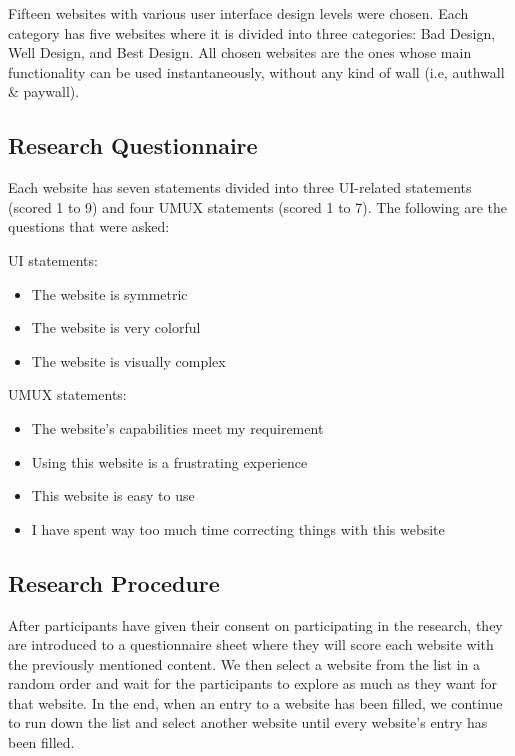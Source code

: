 \documentclass[conference]{IEEEtran}
\begin{document}
Fifteen websites with various user interface design levels were chosen. Each category has five websites where it is divided into three categories: Bad Design, Well Design, and Best Design. All chosen websites are the ones whose main functionality can be used instantaneously, without any kind of wall (i.e, authwall \& paywall).

\subsection{Research Questionnaire}

Each website has seven statements divided into three UI-related statements (scored 1 to 9) and four UMUX statements (scored 1 to 7). The following are the questions that were asked:

UI statements:

\begin{itemize}
    \item The website is symmetric
    \item The website is very colorful
    \item The website is visually complex
\end{itemize}

UMUX statements:

\begin{itemize}
    \item The website's capabilities meet my requirement
    \item Using this website is a frustrating experience
    \item This website is easy to use
    \item I have spent way too much time correcting things with this website
\end{itemize}

\subsection{Research Procedure}

After participants have given their consent on participating in the research, they are introduced to a questionnaire sheet where they will score each website  with the previously mentioned content. We then select a website from the list in a random order and wait for the participants to explore as much as they want for that website. In the end, when an entry to a website has been filled, we continue to run down the list and select another website until every website's entry has been filled.
\end{document}
